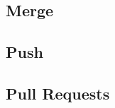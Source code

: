 \documentclass{beamer}
\begin{document}
\subsection{Merge}
\begin{frame}
\frametitle{\insertsection}
\framesubtitle{\insertsubsection}
\end{frame}

\subsection{Push}
\begin{frame}
\frametitle{\insertsection}
\framesubtitle{\insertsubsection}
\end{frame}

\subsection{Pull Requests}
\begin{frame}
\frametitle{\insertsection}
\framesubtitle{\insertsubsection}
\end{frame}
\end{document}

